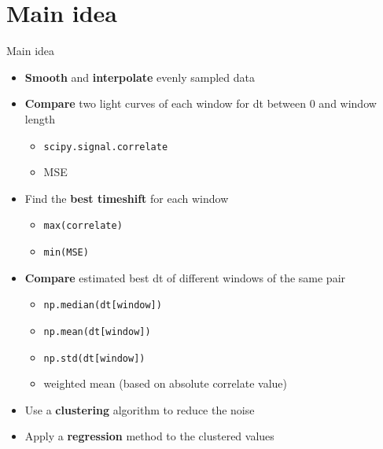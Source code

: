 \documentclass[9pt]{beamer}
\begin{document}
\section{Main idea}
\begin{frame}[fragile]{Main idea}
\begin{itemize}
  \item {\bf Smooth} and {\bf interpolate} evenly sampled data
  \item {\bf Compare} two light curves of each window for dt between 0 and window length
  \begin{itemize}
    \item \lstinline{scipy.signal.correlate}
    \item MSE
  \end{itemize}
  \item Find the {\bf best timeshift} for each window
  \begin{itemize}
    \item \lstinline{max(correlate)}
    \item \lstinline{min(MSE)}
  \end{itemize}
  \item {\bf Compare} estimated best dt of different windows of the same pair
  \begin{itemize}
    \item \lstinline{np.median(dt[window])}
    \item \lstinline{np.mean(dt[window])}
    \item \lstinline{np.std(dt[window])}
    \item weighted mean (based on absolute correlate value)
  \end{itemize}
  \item Use a {\bf clustering} algorithm to reduce the noise
  \item Apply a {\bf regression} method to the clustered values
\end{itemize}
\end{frame}
\end{document}
